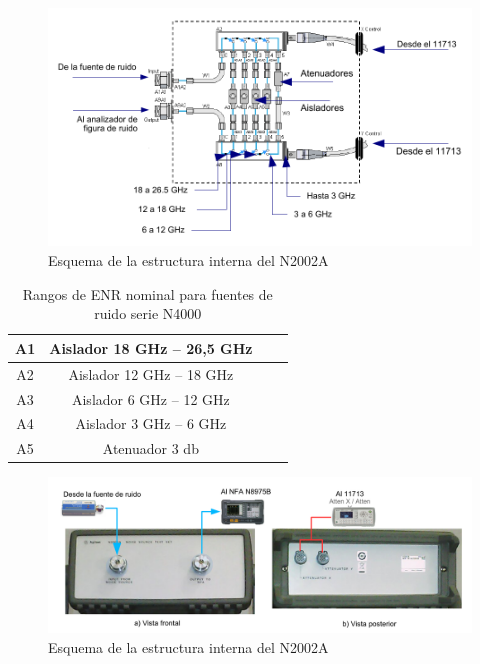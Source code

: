 \begin{figure}[h!]
	\centering
	\includegraphics[width=16cm]{./Imagenes/EsquemaEstructuraInternaN2002.pdf}
	\caption{Esquema de la estructura interna del N2002A}			
	\label{Fig:EsquemaEstructuraInternaN2002}
\end{figure}

\begin{table}[h!]
	\centering
	\begin{tabular}{cccc}
		\toprule
		A1 & Aislador 18 \si{\giga\hertz} – 26,5 \si{\giga\hertz} \\
		\midrule
		A2 & Aislador 12 \si{\giga\hertz} – 18 \si{\giga\hertz} \\
		\midrule
		A3 & Aislador 6 \si{\giga\hertz} – 12 \si{\giga\hertz} \\
		\midrule
		A4 & Aislador 3 \si{\giga\hertz} – 6 \si{\giga\hertz} \\		
		\midrule
		A5 & Atenuador 3 \si{\decibel} \\				
		\bottomrule
	\end{tabular}
	\caption{Rangos de ENR nominal para fuentes de ruido serie N4000}
	\label{Tab:RangosFuentesRuido}
\end{table}


\begin{figure}[h!]
	\centering
	\includegraphics[width=16cm]{./Imagenes/InterfacesElectricasN2002.pdf}
	\caption{Esquema de la estructura interna del N2002A}			
	\label{Fig:InterfacesElectricasN2002}
\end{figure}



